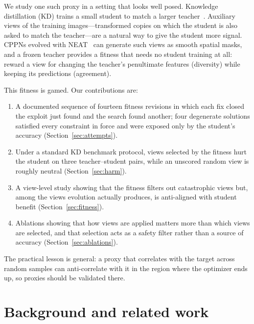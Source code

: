 \documentclass[sigconf,review,anonymous]{acmart}
\begin{document}
We study one such proxy in a setting that looks well posed. Knowledge
distillation (KD) trains a small student to match a larger
teacher~\cite{hinton2015distilling}. Auxiliary views of the training
images---transformed copies on which the student is also asked to match the
teacher---are a natural way to give the student more signal. CPPNs evolved
with NEAT~\cite{stanley2007cppn,stanley2002neat} can generate such views as
smooth spatial masks, and a frozen teacher provides a fitness that needs no
student training at all: reward a view for changing the teacher's
penultimate features (diversity) while keeping its predictions (agreement).

This fitness is gamed. Our contributions are:
\begin{enumerate}
\item A documented sequence of fourteen fitness revisions in which each fix
closed the exploit just found and the search found another; four
degenerate solutions satisfied every constraint in force and were exposed
only by the student's accuracy (Section~\ref{sec:attempts}).
\item Under a standard KD benchmark protocol, views selected by the fitness
hurt the student on three teacher--student pairs, while an unscored random
view is roughly neutral (Section~\ref{sec:harm}).
\item A view-level study showing that the fitness filters out catastrophic
views but, among the views evolution actually produces, is anti-aligned
with student benefit (Section~\ref{sec:fitness}).
\item Ablations showing that how views are applied matters more than which
views are selected, and that selection acts as a safety filter rather than
a source of accuracy (Section~\ref{sec:ablations}).
\end{enumerate}
The practical lesson is general: a proxy that correlates with the target
across random samples can anti-correlate with it in the region where the
optimizer ends up, so proxies should be validated there.

\section{Background and related work}
\label{sec:background}
\end{document}
